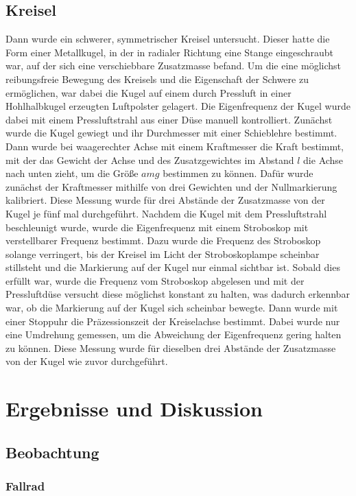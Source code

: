 \documentclass[
	a4paper,
	12pt,
	pagesize,
	ngerman
]{scrartcl}
\begin{document}
	\subsection{Kreisel}
	Dann wurde ein schwerer, symmetrischer Kreisel untersucht.
	Dieser hatte die Form einer Metallkugel, in der in radialer Richtung eine Stange eingeschraubt war, auf der sich eine verschiebbare Zusatzmasse befand.
	Um die eine möglichst reibungsfreie Bewegung des Kreisels und die Eigenschaft der Schwere zu ermöglichen, war dabei die Kugel auf einem durch Pressluft in einer Hohlhalbkugel erzeugten Luftpolster gelagert.
	Die Eigenfrequenz der Kugel wurde dabei mit einem Pressluftstrahl aus einer Düse manuell kontrolliert.
	Zunächst wurde die Kugel gewiegt und ihr Durchmesser mit einer Schieblehre bestimmt.
	Dann wurde bei waagerechter Achse mit einem Kraftmesser die Kraft bestimmt, mit der das Gewicht der Achse und des Zusatzgewichtes im Abstand $ l $ die Achse nach unten zieht, um die Größe $ amg$ bestimmen zu können. %
	Dafür wurde zunächst der Kraftmesser mithilfe von drei Gewichten und der Nullmarkierung kalibriert.
	Diese Messung wurde für drei Abstände der Zusatzmasse von der Kugel je fünf mal durchgeführt.
	Nachdem die Kugel mit dem Pressluftstrahl beschleunigt wurde, wurde die Eigenfrequenz mit einem Stroboskop mit verstellbarer Frequenz bestimmt.
	Dazu wurde die Frequenz des Stroboskop solange verringert, bis der Kreisel im Licht der Stroboskoplampe scheinbar stillsteht und die Markierung auf der Kugel nur einmal sichtbar ist.
	Sobald dies erfüllt war, wurde die Frequenz vom Stroboskop abgelesen und mit der Pressluftdüse versucht diese möglichst konstant zu halten, was dadurch erkennbar war, ob die Markierung auf der Kugel sich scheinbar bewegte.
	Dann wurde mit einer Stoppuhr die Präzessionszeit der Kreiselachse bestimmt.
	Dabei wurde nur eine Umdrehung gemessen, um die Abweichung der Eigenfrequenz gering halten zu können.
	Diese Messung wurde für dieselben drei Abstände der Zusatzmasse von der Kugel wie zuvor durchgeführt.
	
	
	\section{Ergebnisse und Diskussion}
	

	\subsection{Beobachtung}
	\subsubsection{Fallrad}
\end{document}
